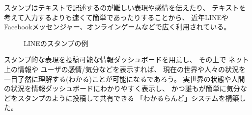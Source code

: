 スタンプはテキストで記述するのが難しい表現や感情を伝えたり、
テキストを考えて入力するよりも速くて簡単であったりすることから、
近年LINEやFacebookメッセンジャー、オンラインゲームなどで広く利用されている。

\begin{figure}[H]
\centering{}
\caption{LINEのスタンプの例}
\label{linestamp}
\end{figure}

スタンプ的な表現を投稿可能な情報ダッシュボードを用意し、
その上で
ネット上の情報や
ユーザの感情/気分などを表示すれば、
現在の世界や人々の状況を一目了然に理解する(わかる)ことが可能になるであろう。
%
実世界の状態や人間の状況を情報ダッシュボードにわかりやすく表示し、
かつ誰もが簡単に気分などをスタンプのように投稿して共有できる
「わかるらんど」システムを構築した。



